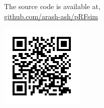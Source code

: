 \documentclass[portrait,final,a0paper,fontscale=0.277]{baposter}
\begin{document}
\begin{poster}
{\begin{minipage}{\linewidth}
\begin{minipage}{0.83\linewidth}
			The source code is available at, \\
				\url{github.com/arash-ash/pRFsim}
		\end{minipage}\hfill%
		\begin{minipage}{0.17\linewidth}
			\hfill\includegraphics[width=\linewidth]{chart}
		\end{minipage}
	\smaller
	\end{minipage}
	\vspace{0.3em}
}


\end{poster}
\end{document}
